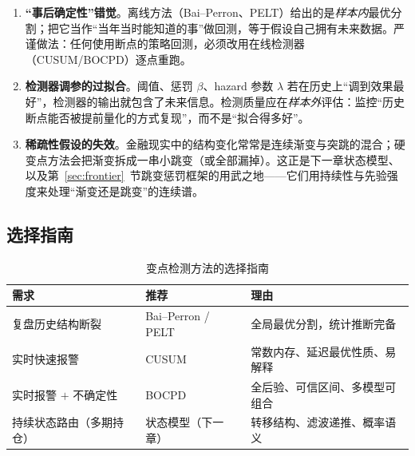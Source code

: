 \begin{enumerate}[itemsep=3pt]
\item \textbf{“事后确定性”错觉}。离线方法（Bai--Perron、PELT）给出的是\emph{样本内}最优分割；把它当作“当年当时能知道的事”做回测，等于假设自己拥有未来数据。严谨做法：任何使用断点的策略回测，必须改用在线检测器（CUSUM/BOCPD）逐点重跑。
\item \textbf{检测器调参的过拟合}。阈值、惩罚 $\beta$、hazard 参数 $\lambda$ 若在历史上“调到效果最好”，检测器的输出就包含了未来信息。检测质量应在\emph{样本外}评估：监控“历史断点能否被提前量化的方式复现”，而不是“拟合得多好”。
\item \textbf{稀疏性假设的失效}。金融现实中的结构变化常常是连续渐变与突跳的混合；硬变点方法会把渐变拆成一串小跳变（或全部漏掉）。这正是下一章状态模型、以及第~\ref{sec:frontier}~节跳变惩罚框架的用武之地——它们用持续性与先验强度来处理“渐变还是跳变”的连续谱。
\end{enumerate}

\subsection{选择指南}

\begin{table}[htbp]
\centering
\footnotesize
\begin{tabular}{p{3.5cm}p{3.4cm}p{4.9cm}}
\toprule
\textbf{需求} & \textbf{推荐} & \textbf{理由} \\
\midrule
复盘历史结构断裂 & Bai--Perron / PELT & 全局最优分割，统计推断完备 \\
实时快速报警 & CUSUM & 常数内存、延迟最优性质、易解释 \\
实时报警 $+$ 不确定性 & BOCPD & 全后验、可信区间、多模型可组合 \\
持续状态路由（多期持仓） & 状态模型（下一章） & 转移结构、滤波递推、概率语义 \\
\bottomrule
\end{tabular}
\caption{变点检测方法的选择指南}
\label{tab:cp-choice}
\end{table}

